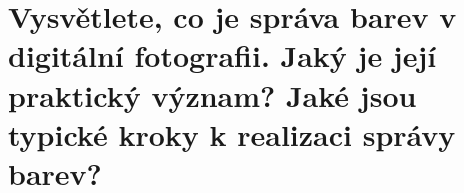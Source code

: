 \section{Vysvětlete, co je správa barev v digitální fotografii. Jaký je její praktický význam? Jaké jsou typické kroky 
k realizaci správy barev?}